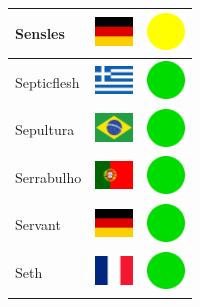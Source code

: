 \documentclass[12pt, a4paper, twoside]{report}
\begin{document}
\begin{center}
\begin{longtable}{|p{5cm}|p{2cm}|p{2cm}|}
 Sensles                                                    & \includegraphics[width=1cm]{../4x3/de} &   \includegraphics[width=1cm]{../likes/m} \\ \hline
 Septicflesh                                                & \includegraphics[width=1cm]{../4x3/gr} &   \includegraphics[width=1cm]{../likes/y} \\ \hline
 Sepultura                                                  & \includegraphics[width=1cm]{../4x3/br} &   \includegraphics[width=1cm]{../likes/y} \\ \hline
 Serrabulho                                                 & \includegraphics[width=1cm]{../4x3/pt} &   \includegraphics[width=1cm]{../likes/y} \\ \hline
 Servant                                                    & \includegraphics[width=1cm]{../4x3/de} &   \includegraphics[width=1cm]{../likes/y} \\ \hline
 Seth                                                       & \includegraphics[width=1cm]{../4x3/fr} &   \includegraphics[width=1cm]{../likes/y} \\ \hline

\end{longtable}
\end{center}
\end{document}
